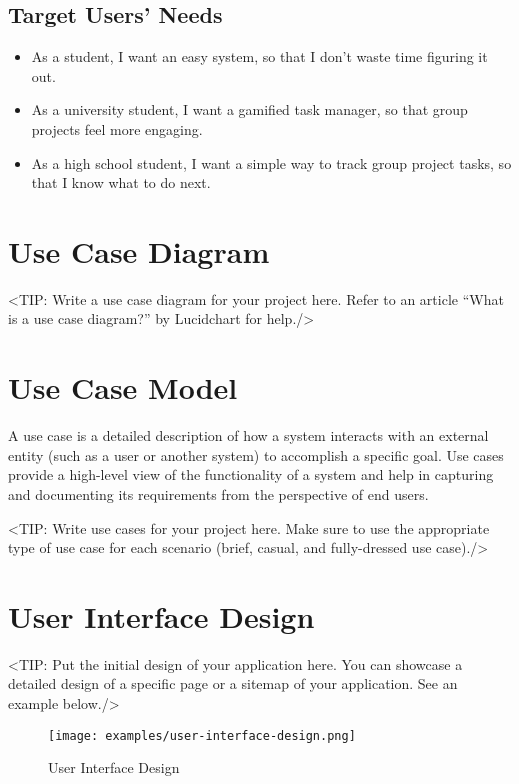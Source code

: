 \subsection{Target Users' Needs}
\begin{itemize}
    \item As a student, I want an easy system, so that I don’t waste time figuring it out.
    \item As a university student, I want a gamified task manager, so that group projects feel more engaging.
    \item As a high school student, I want a simple way to track group project tasks, so that I know what to do next.
\end{itemize}



\section{Use Case Diagram}
\label{section:use-case-diagram}
<TIP: Write a use case diagram for your project here. Refer to an
article “What is a use case diagram?” by Lucidchart for help./>

\section{Use Case Model}
\label{section:use-case-model}
A use case is a detailed description of how a system
interacts with an external entity (such as a user or another system) to
accomplish a specific goal. Use cases provide a high-level view of the
functionality of a system and help in capturing and documenting its
requirements from the perspective of end users.

<TIP: Write use cases for your project here. Make sure to use the
appropriate type of use case for each scenario (brief, casual, and fully-dressed
use case)./>

\section{User Interface Design}
\label{section:user-interface-design}
<TIP: Put the initial design of your application here. You can
showcase a detailed design of a specific page or a sitemap of your application.
See an example below./>

\begin{figure}[h]
    \centering
    \texttt{[image: examples/user-interface-design.png]}
    \caption{User Interface Design}
\end{figure}
